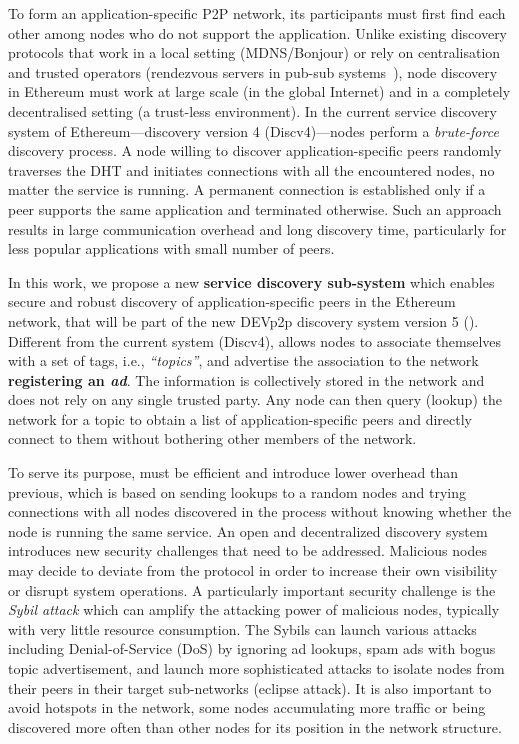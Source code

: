  To form an application-specific P2P network, its participants must first find each other among nodes who do not support the application. 
Unlike existing discovery protocols that work in a local setting (MDNS/Bonjour) or rely on centralisation and trusted operators (\eg rendezvous servers in pub-sub systems~\cite{}), node discovery in Ethereum must work at large scale (in the global Internet) and in a completely decentralised setting  (\ie a trust-less environment). 
In the current service discovery system of Ethereum---\ie discovery version 4 (Discv4)---nodes perform a \textit{brute-force} discovery process. 
A node willing to discover application-specific peers randomly traverses the DHT and initiates connections with all the encountered nodes, no matter the service is running.
A permanent connection is established only if a peer supports the same application and terminated otherwise. 
Such an approach results in large communication overhead and long discovery time, particularly for less popular applications with small number of peers.


 In this work, we propose a new \textbf{service discovery sub-system} which enables secure and robust discovery of application-specific peers in the Ethereum network,  that will be part of the new DEVp2p  discovery system version 5 (\textit{\sysname}).
Different from the current system (Discv4), \sysname allows nodes to associate themselves with a set of tags, i.e., \textit{``topics''}, and advertise the association to the network \ie  \textbf{registering an \emph{ad}}. The information is collectively stored in the network and does not rely on any single trusted party. Any node can then query (\ie lookup) the network for a topic to obtain a list of application-specific peers and directly connect to them without bothering other members of the network. 

To serve its purpose, \sysname must be efficient and introduce lower overhead than previous,  which is based on sending lookups to a random nodes and trying connections with all nodes discovered in the process without knowing whether the node is running the same service.
 An open and decentralized discovery system introduces new security challenges that need to be addressed. Malicious nodes may decide to deviate from the protocol in order to increase their own visibility or disrupt system operations. A particularly important security challenge is the \textit{Sybil attack} which can amplify the attacking power of malicious nodes, typically with very little resource consumption. The Sybils can launch various attacks including Denial-of-Service (DoS) by ignoring ad lookups, spam ads with bogus topic advertisement, and launch more sophisticated attacks to isolate nodes from their peers in their target sub-networks (\ie eclipse attack). 
It is also important to avoid hotspots in the network, \ie some nodes accumulating more traffic or being discovered more often than other nodes for its position in the network structure.

